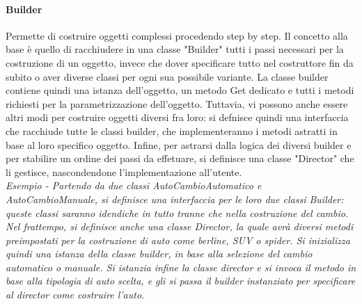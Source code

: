 \documentclass{article}
\begin{document}
            \paragraph{Builder} Permette di costruire oggetti complessi procedendo step by step.
                Il concetto alla base è quello di racchiudere in una classe "Builder" tutti i passi necessari per la costruzione di un oggetto, invece che dover specificare tutto nel costruttore fin da subito o aver diverse classi per ogni sua possibile variante.
                La classe builder contiene quindi una istanza dell'oggetto, un metodo Get dedicato e tutti i metodi richiesti per la parametrizzazione dell'oggetto.
                Tuttavia, vi possono anche essere altri modi per costruire oggetti diversi fra loro: si defnisce quindi una interfaccia che racchiude tutte le classi builder, che implementeranno i metodi astratti in base al loro specifico oggetto.
                Infine, per astrarsi dalla logica dei diversi builder e per stabilire un ordine dei passi da effetuare, si definisce una classe "Director" che li gestisce, nascondendone l'implementazione all'utente.\\
                \textit{Esempio - Partendo da due classi AutoCambioAutomatico e AutoCambioManuale, si definisce una interfaccia per le loro due classi Builder: queste classi saranno idendiche in tutto tranne che nella costruzione del cambio.
                    Nel frattempo, si definisce anche una classe Director, la quale avrà diversi metodi preimpostati per la costruzione di auto come berline, SUV o spider.
                    Si inizializza quindi una istanza della classe builder, in base alla selezione del cambio automatico o manuale.
                    Si istanzia infine la classe director e si invoca il metodo in base alla tipologia di auto scelta, e gli si passa il builder instanziato per specificare al director come costruire l'auto.
                }
\end{document}
